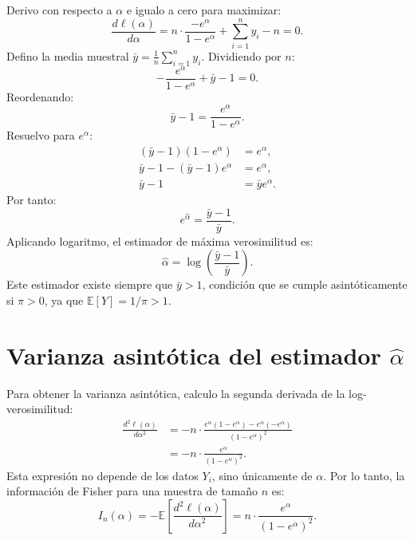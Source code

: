 \documentclass{article}
\begin{document}
Derivo con respecto a $\alpha$ e igualo a cero para maximizar:
\begin{equation}
\frac{d\ell(\alpha)}{d\alpha} = n \cdot \frac{-e^\alpha}{1-e^\alpha} + \sum_{i=1}^n y_i - n = 0.
\end{equation}
Defino la media muestral $\bar{y} = \frac{1}{n}\sum_{i=1}^n y_i$. Dividiendo por $n$:
\begin{equation}
-\frac{e^\alpha}{1-e^\alpha} + \bar{y} - 1 = 0.
\end{equation}
Reordenando:
\begin{equation}
\bar{y} - 1 = \frac{e^\alpha}{1-e^\alpha}.
\end{equation}
Resuelvo para $e^\alpha$:
\begin{align}
(\bar{y} - 1)(1 - e^\alpha) &= e^\alpha, \\
\bar{y} - 1 - (\bar{y} - 1)e^\alpha &= e^\alpha, \\
\bar{y} - 1 &= \bar{y} e^\alpha.
\end{align}
Por tanto:
\begin{equation}
e^{\hat{\alpha}} = \frac{\bar{y} - 1}{\bar{y}}.
\end{equation}
Aplicando logaritmo, el estimador de máxima verosimilitud es:
\begin{equation}
\boxed{\hat{\alpha} = \log\left(\frac{\bar{y} - 1}{\bar{y}}\right)}.
\end{equation}
Este estimador existe siempre que $\bar{y} > 1$, condición que se cumple asintóticamente si $\pi > 0$, ya que $\mathbb{E}[Y] = 1/\pi > 1$.

\section{Varianza asintótica del estimador $\hat{\alpha}$}

Para obtener la varianza asintótica, calculo la segunda derivada de la log-verosimilitud:
\begin{align}
\frac{d^2\ell(\alpha)}{d\alpha^2} &= -n \cdot \frac{e^\alpha(1-e^\alpha) - e^\alpha(-e^\alpha)}{(1-e^\alpha)^2} \\
                                  &= -n \cdot \frac{e^\alpha}{(1-e^\alpha)^2}.
\end{align}
Esta expresión no depende de los datos $Y_i$, sino únicamente de $\alpha$. Por lo tanto, la información de Fisher para una muestra de tamaño $n$ es:
\begin{equation}
I_n(\alpha) = -\mathbb{E}\left[\frac{d^2\ell(\alpha)}{d\alpha^2}\right] = n \cdot \frac{e^\alpha}{(1-e^\alpha)^2}.
\end{equation}
\end{document}
